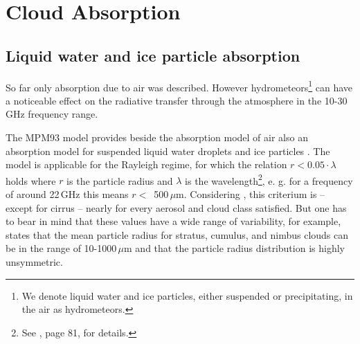 \begin{flushleft}
\end{flushleft}
\begin{flushleft}
\end{flushleft}
\begin{flushleft}
\end{flushleft}








\chapter{Cloud Absorption}
\label{labela:cloudabsorption}

\section{Liquid water and ice particle absorption}
\label{levelb:lipartabs}
So far only absorption due to air was described. However 
hydrometeors\footnote{We denote liquid water and ice particles, either
  suspended or precipitating, in the air as hydrometeors.}
can have a noticeable effect on the radiative transfer through the
atmosphere in the 10-30\,GHz frequency range.

The MPM93 model provides beside the absorption model of air also an
absorption model for suspended liquid water droplets and ice particles
\citep{liebe:89b,liebeetal:91,hufford:91,liebeetal:93}.  The model is
applicable for the Rayleigh regime, for which the relation $r <
0.05\cdot \lambda$ holds where $r$ is the particle radius and
$\lambda$ is the wavelength\footnote{See \citet{brussaard:95}, page
  81, for details.}, e. g. for a frequency of around 22\,GHz 
this means $r<$~500\,$\mu$m. Considering \citet{salby:96}, this criterium is --
except for cirrus -- nearly for every aerosol and cloud class
satisfied. But one has to bear in mind that these values have a wide
range of variability, for example, \citet{salby:96} states that the
mean particle radius for stratus, cumulus, and nimbus clouds can be in
the range of 10-1000\,$\mu$m and that the particle radius distribution
is highly unsymmetric. 

